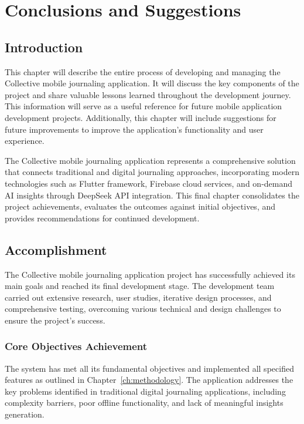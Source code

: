 \chapter{Conclusions and Suggestions}\label{ch:conclusions}

\section{Introduction}\label{sec:conclusionsIntroduction}

This chapter will describe the entire process of developing and managing the Collective mobile journaling application. It will discuss the key components of the project and share valuable lessons learned throughout the development journey. This information will serve as a useful reference for future mobile application development projects. Additionally, this chapter will include suggestions for future improvements to improve the application's functionality and user experience.

The Collective mobile journaling application represents a comprehensive solution that connects traditional and digital journaling approaches, incorporating modern technologies such as Flutter framework, Firebase cloud services, and on-demand AI insights through DeepSeek API integration. This final chapter consolidates the project achievements, evaluates the outcomes against initial objectives, and provides recommendations for continued development.

\section{Accomplishment}\label{sec:accomplishment}

The Collective mobile journaling application project has successfully achieved its main goals and reached its final development stage. The development team carried out extensive research, user studies, iterative design processes, and comprehensive testing, overcoming various technical and design challenges to ensure the project's success.

\subsection{Core Objectives Achievement}

The system has met all its fundamental objectives and implemented all specified features as outlined in Chapter~\ref{ch:methodology}. The application addresses the key problems identified in traditional digital journaling applications, including complexity barriers, poor offline functionality, and lack of meaningful insights generation.

